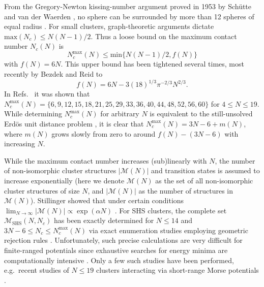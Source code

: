 From the Gregory-Newton kissing-number argument proved in 1953 by Sch\"utte and
van der Waerden \autocite{Schutte_ProblemdreizehnKugeln_1952}, no sphere can be
surrounded by more than 12 spheres of equal radius \autocite{conway-2013book}.  For
small clusters, graph-theoretic arguments dictate $\mathrm{max}(N_c)\le
N(N-1)/2$.  Thus a loose bound on the maximum contact number $N_c(N)$ is
\begin{equation}
    N_c^\mathrm{max}(N) \le \mathrm{min}\{N(N-1)/2,f(N)\}
    \label{eqn:upperlimitNc}
\end{equation}
with $f(N)=6N$.  This upper bound has been tightened several times, most
recently by Bezdek and Reid \autocite{Bezdek-2013} to
\begin{equation}
    f(N)=6N-3(18)^{1/3}\pi^{-2/3}N^{2/3}.
    \label{eqn:upperlimitBR}
\end{equation}
In
Refs.~\autocite{Hoy_Structuredynamicsmodel_2015,Holmes-Cerfon_EnumeratingRigidSphere_2016}
it was shown that $N_c^\mathrm{max}(N) =
\{6,9,12,15,18,21,25,29,33,36,40,44,48,52,56,60\}$ for $4 \leq N \leq 19$.
While determining $N_c^\mathrm{max}(N)$ for arbitrary $N$ is equivalent to the
still-unsolved Erd\"os unit distance problem \autocite{Erdos-1946}, it is clear
that $N_c^\mathrm{max}(N) = 3N - 6 + m(N)$, where $m(N)$ grows slowly from zero
to around $f(N) - (3N-6)$ with increasing $N$.

While the maximum contact number increases (sub)linearly with $N$, the number
of non-isomorphic cluster structures $|\mathcal{M}(N)|$ and transition states
is assumed to increase exponentially
\autocite{Stillinger_Exponentialmultiplicityinherent_1999,Oganov-2006,Forman_ModelingAggregationProcesses_2017}
(here we denote $\mathcal{M}(N)$ as the set of all non-isomorphic cluster
structures of size $N$, and $|\mathcal{M}(N)|$ as the number of structures in
$\mathcal{M}(N)$).  Stillinger showed that under certain conditions
$\lim_{N\to\infty} |\mathcal{M}(N)| \propto \exp(\alpha N)$
\autocite{Stillinger_Exponentialmultiplicityinherent_1999}.  For \ac{SHS}
clusters, the complete set $\mathcal{M}_\mathrm{SHS}(N,N_c)$ has been exactly
determined for $N \leq 14$ and $3N - 6 \leq N_c \leq N_c^\mathrm{max}(N)$ via
exact enumeration studies employing geometric rejection rules
\autocite{Hoy_Structuredynamicsmodel_2015,Holmes-Cerfon_EnumeratingRigidSphere_2016}.
Unfortunately, such precise calculations are very difficult for finite-ranged
potentials since exhaustive searches for energy minima are computationally
intensive \autocite{Heiles_Globaloptimizationclusters_2013}.  Only a few such
studies have been performed, e.g.\ recent studies of $N \leq 19$ clusters
interacting via short-range Morse potentials
\autocite{wales10,calvo12,C7CP03346J}.

